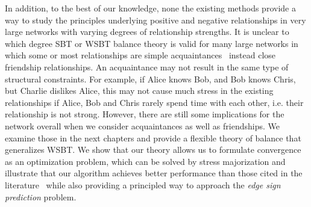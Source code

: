 In addition, to the best of our knowledge, none the existing methods
provide a way to study the principles underlying positive and
negative relationships in very large networks with varying degrees of
relationship strengths. It is unclear to which degree SBT or WSBT
balance theory is valid for many large networks in which some or most
relationships are simple acquaintances~\cite{Granovetter:1973} instead
close friendship relationships. An acquaintance may not result in the
same type of structural constraints. For example, if Alice knows Bob,
and Bob knows Chris, but Charlie dislikes Alice, this may not cause
much stress in the existing relationships if Alice, Bob and Chris
rarely spend time with each other, i.e. their relationship is not
strong. However, there are still some implications for the network
overall when we consider acquaintances as well as friendships. We
examine those in the next chapters and provide a flexible theory of
balance that generalizes WSBT. We show that our theory allows us to
formulate convergence as an optimization problem, which can be solved
by stress majorization and illustrate that our algorithm achieves
better performance than those cited in the
literature~\cite{golbeck:distrust2011} while also providing a
principled way to approach the {\it edge sign prediction} problem.

